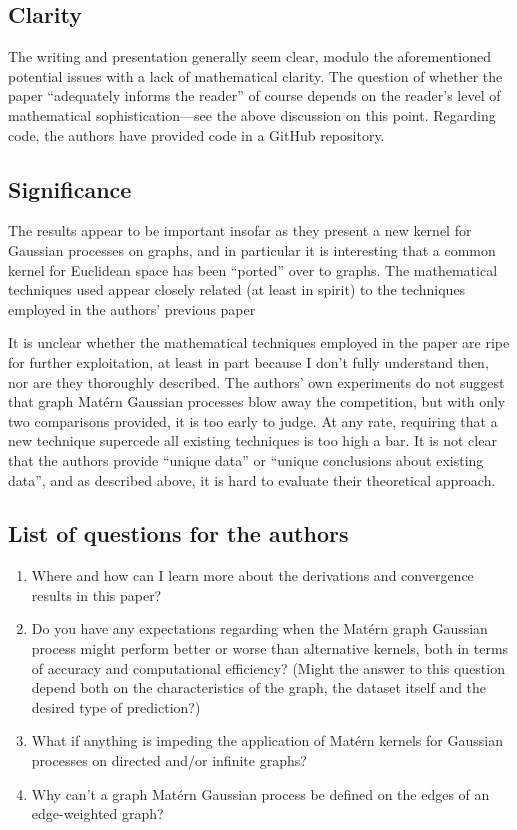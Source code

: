 \subsection{Clarity}

The writing and presentation generally seem clear, modulo the aforementioned potential issues with a lack of mathematical clarity. The question of whether the paper ``adequately informs the reader'' of course depends on the reader's level of mathematical sophistication---see the above discussion on this point. Regarding code, the authors have provided code in a GitHub repository.

\subsection{Significance}

The results appear to be important insofar as they present a new kernel for Gaussian processes on graphs, and in particular it is interesting that a common kernel for Euclidean space has been ``ported'' over to graphs. The mathematical techniques used appear closely related (at least in spirit) to the techniques employed in the authors' previous paper \cite{NEURIPS2020_92bf5e62}

It is unclear whether the mathematical techniques employed in the paper are ripe for further exploitation, at least in part because I don't fully understand then, nor are they thoroughly described. The authors' own experiments do not suggest that graph Mat\'{e}rn Gaussian processes blow away the competition, but with only two comparisons provided, it is too early to judge. At any rate, requiring that a new technique supercede all existing techniques is too high a bar. It is not clear that the authors provide ``unique data'' or ``unique conclusions about existing data'', and as described above, it is hard to evaluate their theoretical approach.

\subsection{List of questions for the authors}

\begin{enumerate}
    \item Where and how can I learn more about the derivations and convergence results in this paper?
    \item Do you have any expectations regarding when the Mat\'{e}rn graph Gaussian process might perform better or worse than alternative kernels, both in terms of accuracy and computational efficiency? (Might the answer to this question depend both on the characteristics of the graph, the dataset itself and the desired type of prediction?)
    \item What if anything is impeding the application of Mat\'{e}rn kernels for Gaussian processes on directed and/or infinite graphs?
    \item Why can't a graph Mat\'{e}rn Gaussian process be defined on the edges of an edge-weighted graph?
\end{enumerate}

